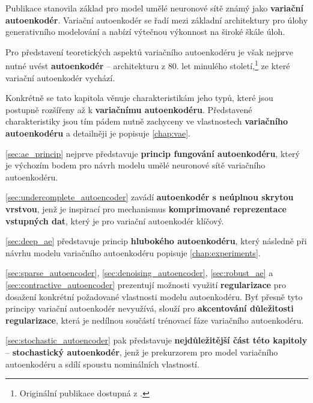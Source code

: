 Publikace \textcite{Kingma2014} stanovila základ pro model umělé neuronové sítě známý jako \textbf{variační autoenkodér}.
Variační autoenkodér se řadí mezi základní architektury pro úlohy generativního modelování a nabízí výtečnou výkonnost na široké škále úloh. \cite{Kingma2014, Kingma2019}

Pro představení teoretických aspektů variačního autoenkodéru je však nejprve nutné uvést \textbf{autoenkodér} – architekturu z 80. let minulého století,\footnote{Originální publikace dostupná z \textcite{Rumelhart1987}.} ze které variační autoenkodér vychází.

Konkrétně se tato kapitola věnuje charakteristikám jeho typů, které jsou postupně rozšířeny až k \textbf{variačnímu autoenkodéru}.
Představené charakteristiky jsou tím pádem nutně zachyceny ve vlastnostech \textbf{variačního autoenkodéru} a detailněji je popisuje \autoref{chap:vae}.

\autoref{sec:ae_princip} nejprve představuje \textbf{princip fungování autoenkodéru}, který je výchozím bodem pro návrh modelu umělé neuronové sítě variačního autoenkodéru.

\autoref{sec:undercomplete_autoencoder} zavádí \textbf{autoenkodér s neúplnou skrytou vrstvou}, jenž je inspirací pro mechanismus \textbf{komprimované reprezentace vstupných dat}, který je pro variační autoenkodér klíčový.

\autoref{sec:deep_ae} představuje princip \textbf{hlubokého autoenkodéru}, který následně při návrhu modelu variačního autoenkodéru popisuje \autoref{chap:experiments}.

\autoref{sec:sparse_autoencoder}, \autoref{sec:denoising_autoencoder}, \autoref{sec:robust_ae} a \autoref{sec:contractive_autoencoder} prezentují možnosti využití \textbf{regularizace} pro dosažení konkrétní požadované vlastnosti modelu autoenkodéru.
Byť přesně tyto principy variační autoenkodér nevyužívá, slouží pro \textbf{akcentování důležitosti regularizace}, která je nedílnou součástí trénovací fáze variačního autoenkodéru.

\autoref{sec:stochastic_autoencoder} pak představuje \textbf{nejdůležitější část této kapitoly} – \textbf{stochastický autoenkodér}, jenž je prekurzorem pro model variačního autoenkodéru a sdílí spoustu nominálních vlastností.
\newpage
